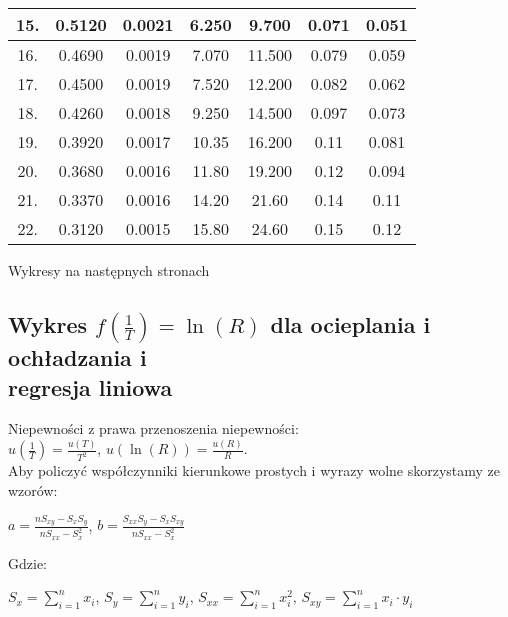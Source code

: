 \documentclass[12pt]{article}
\begin{document}
\begin{center}
\begin{tabular} { | c | c | c | c | c | c | c | }
        15. & 0.5120 & 0.0021    & 6.250            & 9.700            & 0.071               & 0.051               \\ \hline
        16. & 0.4690 & 0.0019    & 7.070            & 11.500           & 0.079               & 0.059               \\ \hline
        17. & 0.4500 & 0.0019    & 7.520            & 12.200           & 0.082               & 0.062               \\ \hline
        18. & 0.4260 & 0.0018    & 9.250            & 14.500           & 0.097               & 0.073               \\ \hline
        19. & 0.3920 & 0.0017    & 10.35            & 16.200           & 0.11                & 0.081               \\ \hline
        20. & 0.3680 & 0.0016    & 11.80            & 19.200           & 0.12                & 0.094               \\ \hline
        21. & 0.3370 & 0.0016    & 14.20            & 21.60            & 0.14                & 0.11                \\ \hline
        22. & 0.3120 & 0.0015    & 15.80            & 24.60            & 0.15                & 0.12                \\

        \hline
    \end{tabular}
\end{center}

Wykresy na następnych stronach



\subsection*{Wykres $f(\frac{1}{T}) = \ln(R)$ dla ocieplania i ochładzania
    i \\ regresja liniowa}
Niepewności z prawa przenoszenia niepewności: \\
\indent $u(\frac{1}{T}) = \frac{u(T)}{T^2}$, $u(\ln(R)) = \frac{u(R)}{R}$. \\
Aby policzyć współczynniki kierunkowe prostych i wyrazy wolne skorzystamy ze
wzorów:
\begin{flushleft}

    \begin{center}
        $a = \frac{nS_{xy} - S_xS_y}{nS_{xx}-S_x^2}$, $b
            =\frac{S_{xx}S_y-S_xS_{xy}}{nS_{xx}-S_x^2}$
    \end{center}
    Gdzie: \\
    \begin{center}
        $S_x=\displaystyle\sum_{i=1}^{n}x_i$,
        $S_y=\displaystyle\sum_{i=1}^{n}y_i$,
        $S_{xx}=\displaystyle\sum_{i=1}^{n}x_i^2$,
        $S_{xy}=\displaystyle\sum_{i=1}^{n}x_i \cdot y_i$ \\
    \end{center}
\end{flushleft}
\end{document}
